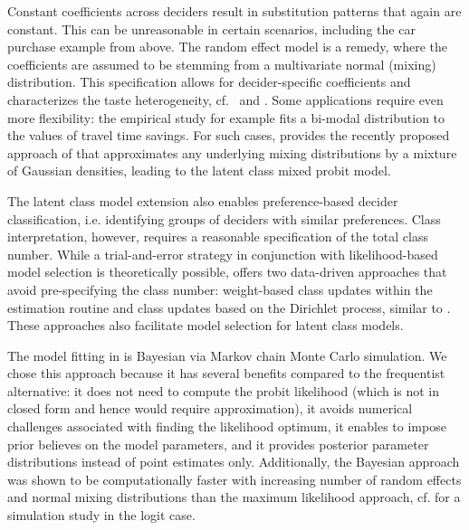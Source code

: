 \documentclass[article,shortnames]{jss}
\begin{document}
Constant coefficients across deciders result in substitution patterns that again are constant. This can be unreasonable in certain scenarios, including the car purchase example from above. The random effect model is a remedy, where the coefficients are assumed to be stemming from a multivariate normal (mixing) distribution. This specification allows for decider-specific coefficients and characterizes the taste heterogeneity, cf.\ \cite{Train:2009} and \cite{Bhat:2011}. Some applications require even more flexibility: the empirical study \cite{Cirillo:2006} for example fits a bi-modal distribution to the values of travel time savings. For such cases,  provides the recently proposed approach of \cite{Oelschlaeger:2020} that approximates any underlying mixing distributions by a mixture of Gaussian densities, leading to the latent class mixed probit model.

The latent class model extension also enables preference-based decider classification, i.e. identifying groups of deciders with similar preferences. Class interpretation, however, requires a reasonable specification of the total class number. While a trial-and-error strategy in conjunction with likelihood-based model selection is theoretically possible,  offers two data-driven approaches that avoid pre-specifying the class number: weight-based class updates within the estimation routine \citep{Oelschlaeger:2020} and class updates based on the Dirichlet process, similar to \cite{Burda:2008}. These approaches also facilitate model selection for latent class models.

The model fitting in  is Bayesian via Markov chain Monte Carlo simulation. We chose this approach because it has several benefits compared to the frequentist alternative: it does not need to compute the probit likelihood (which is not in closed form and hence would require approximation), it avoids numerical challenges associated with finding the likelihood optimum, it enables to impose prior believes on the model parameters, and it provides posterior parameter distributions instead of point estimates only. Additionally, the Bayesian approach was shown to be computationally faster with increasing number of random effects and normal mixing distributions than the maximum likelihood approach, cf. \cite{Train:2001} for a simulation study in the logit case.
\end{document}
